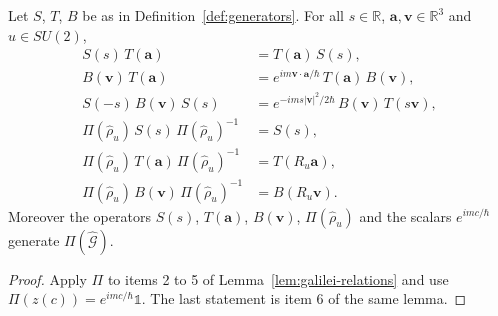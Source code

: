 \begin{proposition}\label{prop:unitary-relations}
	Let $S$, $T$, $B$ be as in Definition~\ref{def:generators}. For all $s\in\mathbb{R}$, $\mathbf{a},\mathbf{v}\in\mathbb{R}^3$ and $u\in SU(2)$,
	\begin{align}
		S(s)\,T(\mathbf{a}) &= T(\mathbf{a})\,S(s), \tag{W1}\label{eq:W1}\\
		B(\mathbf{v})\,T(\mathbf{a}) &= e^{im\mathbf{v}\cdot\mathbf{a}/\hbar}\,T(\mathbf{a})\,B(\mathbf{v}), \tag{W2}\label{eq:W2}\\
		S(-s)\,B(\mathbf{v})\,S(s) &= e^{-ims|\mathbf{v}|^2/2\hbar}\,B(\mathbf{v})\,T(s\mathbf{v}), \tag{W3}\label{eq:W3}\\
		\Pi(\hat\rho_u)\,S(s)\,\Pi(\hat\rho_u)^{-1} &= S(s), \tag{W4a}\label{eq:W4a}\\
		\Pi(\hat\rho_u)\,T(\mathbf{a})\,\Pi(\hat\rho_u)^{-1} &= T(R_u\mathbf{a}), \tag{W4b}\label{eq:W4b}\\
		\Pi(\hat\rho_u)\,B(\mathbf{v})\,\Pi(\hat\rho_u)^{-1} &= B(R_u\mathbf{v}). \tag{W4c}\label{eq:W4c}
	\end{align}
	Moreover the operators $S(s)$, $T(\mathbf{a})$, $B(\mathbf{v})$, $\Pi(\hat\rho_u)$ and the scalars $e^{imc/\hbar}$ generate $\Pi(\widehat{\mathcal{G}})$.
\end{proposition}

\begin{proof}
	Apply $\Pi$ to items 2 to 5 of Lemma~\ref{lem:galilei-relations} and use $\Pi(z(c))=e^{imc/\hbar}\mathbb{1}$. The last statement is item 6 of the same lemma.
\end{proof}

